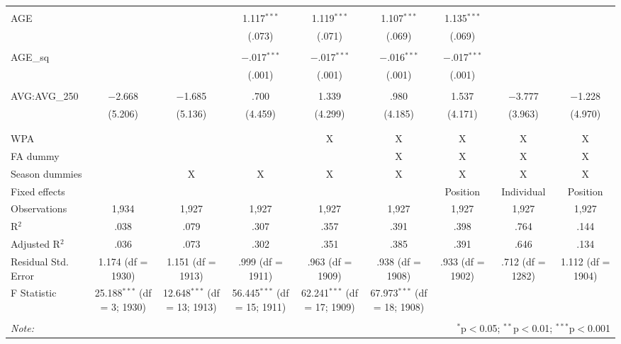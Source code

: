 \begin{table}[H]
\begin{tabular}{@{\extracolsep{5pt}}lcccccccc}
  & & & & & & & & \\
 AGE &  &  & 1.117$^{***}$ & 1.119$^{***}$ & 1.107$^{***}$ & 1.135$^{***}$ &  &  \\
  &  &  & (.073) & (.071) & (.069) & (.069) &  &  \\
  & & & & & & & & \\
 AGE\_sq &  &  & $-$.017$^{***}$ & $-$.017$^{***}$ & $-$.016$^{***}$ & $-$.017$^{***}$ &  &  \\
  &  &  & (.001) & (.001) & (.001) & (.001) &  &  \\
  & & & & & & & & \\
 AVG:AVG\_250 & $-$2.668 & $-$1.685 & .700 & 1.339 & .980 & 1.537 & $-$3.777 & $-$1.228 \\
  & (5.206) & (5.136) & (4.459) & (4.299) & (4.185) & (4.171) & (3.963) & (4.970) \\
  & & & & & & & & \\
\hline \\[-1.8ex]
WPA &  &  &  & X & X & X & X & X \\
FA dummy &  &  &  &  & X & X & X & X \\
Season dummies &  & X & X & X & X & X & X & X \\
Fixed effects &  &  &  &  &  & Position & Individual & Position \\
Observations & 1,934 & 1,927 & 1,927 & 1,927 & 1,927 & 1,927 & 1,927 & 1,927 \\
R$^{2}$ & .038 & .079 & .307 & .357 & .391 & .398 & .764 & .144 \\
Adjusted R$^{2}$ & .036 & .073 & .302 & .351 & .385 & .391 & .646 & .134 \\
Residual Std. Error & 1.174 (df = 1930) & 1.151 (df = 1913) & .999 (df = 1911) & .963 (df = 1909) & .938 (df = 1908) & .933 (df = 1902) & .712 (df = 1282) & 1.112 (df = 1904) \\
F Statistic & 25.188$^{***}$ (df = 3; 1930) & 12.648$^{***}$ (df = 13; 1913) & 56.445$^{***}$ (df = 15; 1911) & 62.241$^{***}$ (df = 17; 1909) & 67.973$^{***}$ (df = 18; 1908) &  &  &  \\
\hline
\hline \\[-1.8ex]
\textit{Note:}  & \multicolumn{8}{r}{$^{*}$p$<$0.05; $^{**}$p$<$0.01; $^{***}$p$<$0.001} \\
\end{tabular}
\end{table}
